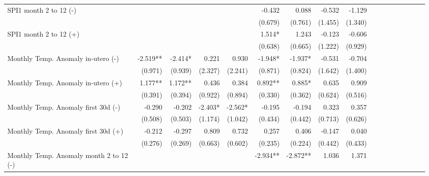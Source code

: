 \begin{table}[H]
\begin{adjustbox}{max width=\linewidth}
\begin{tabular}{lrrrrrrrrrrrrrrrr}
SPI1 month 2 to 12  (-)                      &             &              &             &             &       -0.432 &        0.088 &       -0.532 &       -1.129 \\
                                             &             &              &             &             &      (0.679) &      (0.761) &      (1.455) &      (1.340) \\
SPI1 month 2 to 12  (+)                      &             &              &             &             &       1.514* &        1.243 &       -0.123 &       -0.606 \\
                                             &             &              &             &             &      (0.638) &      (0.665) &      (1.222) &      (0.929) \\
Monthly Temp. Anomaly in-utero   (-)         &    -2.519** &     -2.414*  &       0.221 &       0.930 &      -1.948* &      -1.937* &       -0.531 &       -0.704 \\
                                             &     (0.971) &     (0.939)  &     (2.327) &     (2.241) &      (0.871) &      (0.824) &      (1.642) &      (1.400) \\
Monthly Temp. Anomaly in-utero  (+)          &     1.177** &     1.172**  &       0.436 &       0.384 &      0.892** &       0.885* &        0.635 &        0.909 \\
                                             &     (0.391) &     (0.394)  &     (0.922) &     (0.894) &      (0.330) &      (0.362) &      (0.624) &      (0.516) \\
Monthly Temp. Anomaly first 30d   (-)        &      -0.290 &      -0.202  &     -2.403* &     -2.562* &       -0.195 &       -0.194 &        0.323 &        0.357 \\
                                             &     (0.508) &     (0.503)  &     (1.174) &     (1.042) &      (0.434) &      (0.442) &      (0.713) &      (0.626) \\
Monthly Temp. Anomaly first 30d (+)          &      -0.212 &      -0.297  &       0.809 &       0.732 &        0.257 &        0.406 &       -0.147 &        0.040 \\
                                             &     (0.276) &     (0.269)  &     (0.663) &     (0.602) &      (0.235) &      (0.224) &      (0.442) &      (0.433) \\
Monthly Temp. Anomaly month 2 to 12 (-)      &             &              &             &             &     -2.934** &     -2.872** &        1.036 &        1.371 \\

\end{tabular}
\end{adjustbox}
\end{table}
